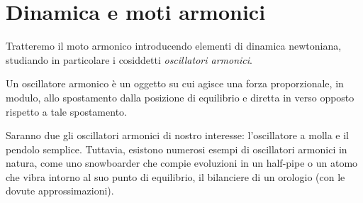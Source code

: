 \section{Dinamica e moti armonici}
Tratteremo il moto armonico introducendo elementi di dinamica newtoniana,
studiando in particolare i cosiddetti \textit{oscillatori armonici}.
\vspace{8pt}
\begin{tcolorbox}[colback = yellow!30, colframe = yellow!30!black, title = {Oscillatore armonico}]
    Un oscillatore armonico è un oggetto su cui agisce una forza proporzionale,
    in modulo, allo spostamento dalla posizione di equilibrio e diretta in
    verso opposto rispetto a tale spostamento.
\end{tcolorbox}
\vspace{5pt}
Saranno due gli oscillatori armonici di nostro interesse: l'oscillatore a
molla e il pendolo semplice. Tuttavia, esistono numerosi esempi di oscillatori
armonici in natura, come uno snowboarder che compie evoluzioni in un half-pipe o
un atomo che vibra intorno al suo punto di equilibrio, il bilanciere di un
orologio (con le dovute approssimazioni).



